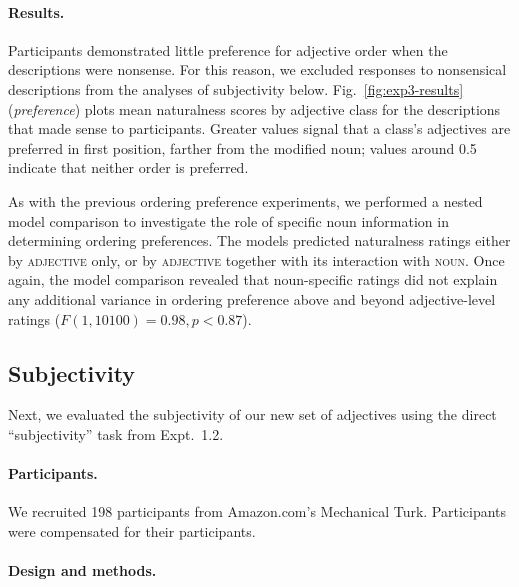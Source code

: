 \documentclass[12pt]{article}
\begin{document}
\paragraph{Results.}


Participants demonstrated little preference for adjective order when the descriptions were nonsense. For this reason, we excluded responses to nonsensical descriptions from the analyses of subjectivity below. Fig.~\ref{fig:exp3-results} (\emph{preference}) plots mean naturalness scores by adjective class for the descriptions that made sense to participants. Greater values signal that a class's adjectives are preferred in first position, farther from the modified noun; values around 0.5 indicate that neither order is preferred. 

As with the previous ordering preference experiments, we performed a nested model comparison to investigate the role of specific noun information in determining ordering preferences. The models predicted naturalness ratings either by \textsc{adjective} only, or by \textsc{adjective} together with its interaction with \textsc{noun}. Once again, the model comparison revealed that noun-specific ratings did not explain any additional variance in ordering preference above and beyond adjective-level ratings ($F(1,10100) = 0.98, p < 0.87$).

\subsection{Subjectivity}

Next, we evaluated the subjectivity of our new set of adjectives using the direct ``subjectivity'' task from Expt.~1.2.

\paragraph{Participants.}

We recruited 198 participants from Amazon.com's Mechanical Turk. Participants were compensated for their participants.

\paragraph{Design and methods.}
\end{document}
